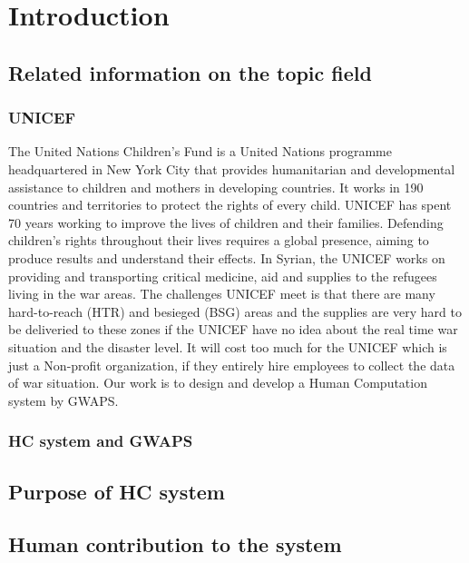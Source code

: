 \section{Introduction}
\subsection{Related information on the topic field}
	\subsubsection{UNICEF}
		The United Nations Children's Fund\cite{unicef1994state} is a United Nations programme headquartered in New York City that provides humanitarian and developmental assistance to children and mothers in developing countries. It works in 190 countries and territories to protect the rights of every child. UNICEF has spent 70 years working to improve the lives of children and their families. Defending children's rights throughout their lives requires a global presence, aiming to produce results and understand their effects. In Syrian, the UNICEF works on providing and transporting critical medicine, aid and supplies to the refugees living in the war areas. The challenges UNICEF meet is that there are many hard-to-reach (HTR) and besieged (BSG) areas and the supplies are very hard to be deliveried to these zones if the UNICEF have no idea about the real time war situation and the disaster level. It will cost too much for the UNICEF which is just a Non-profit organization, if they entirely hire employees to collect the data of war situation. Our work is to design and develop a Human Computation system by GWAPS\cite{lafourcade2015games}.
	\subsubsection{HC system and GWAPS}
\subsection{Purpose of HC system}
\subsection{Human contribution to the system}
